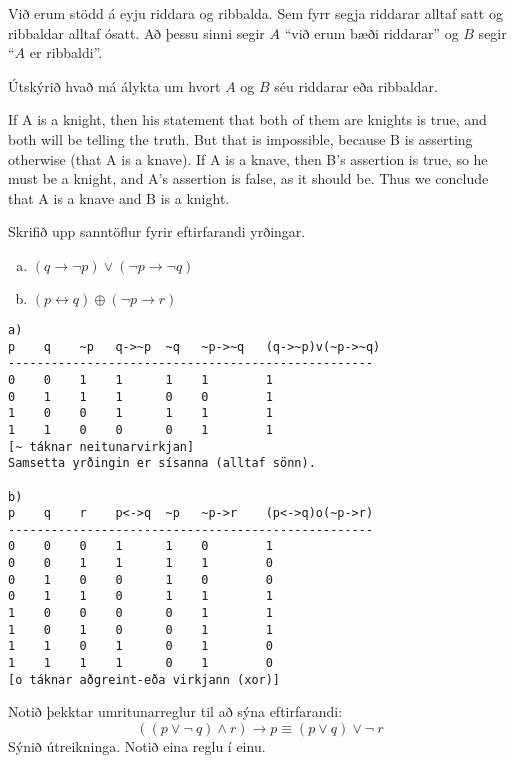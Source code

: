 \documentclass{exam}
\begin{document}
\begin{questions}
\begin{solution}
\end{solution}

\question Við erum stödd á eyju riddara og ribbalda. Sem fyrr segja riddarar alltaf satt og ribbaldar alltaf ósatt. Að þessu sinni segir $A$ ``við erum bæði riddarar'' og $B$ segir ``$A$ er ribbaldi''.

Útskýrið hvað má álykta um hvort $A$ og $B$ séu riddarar eða ribbaldar.

\begin{solution}

If A is a knight, then his statement that both of them are knights is true, and both will be telling the truth. But that is impossible, because B is asserting otherwise (that A is a knave). If A is a knave, then B’s assertion is true, so he must be a knight, and A’s assertion is false, as it should be. Thus we conclude that A is a knave and B is a knight.
\end{solution}

\newpage

\question Skrifið upp sanntöflur fyrir eftirfarandi yrðingar.
\begin{enumerate}[a)]
\item $(q \rightarrow \lnot p) \lor (\lnot p \rightarrow \lnot q)$
\item $(p \leftrightarrow q) \oplus (\lnot p \rightarrow r)$
\end{enumerate}

\begin{solution}
\begin{verbatim}
a)
p    q    ~p   q->~p  ~q   ~p->~q   (q->~p)v(~p->~q)
---------------------------------------------------
0    0    1    1      1	   1        1
0    1    1    1      0    0        1
1    0    0    1      1    1        1
1    1    0    0      0    1        1
[~ táknar neitunarvirkjan]
Samsetta yrðingin er sísanna (alltaf sönn).

b)
p    q    r    p<->q  ~p   ~p->r    (p<->q)o(~p->r)
---------------------------------------------------
0    0    0    1      1    0        1
0    0    1    1      1    1        0
0    1    0    0      1    0        0
0    1    1    0      1    1        1
1    0    0    0      0    1        1
1    0    1    0      0    1        1
1    1    0    1      0    1        0
1    1    1    1      0    1        0
[o táknar aðgreint-eða virkjann (xor)]
\end{verbatim}
\end{solution}

\question Notið þekktar umritunarreglur til að sýna eftirfarandi:
\[ (( p \lor \lnot ~q) \land r) \rightarrow p \equiv (p \lor q) \lor \lnot ~r \]
Sýnið útreikninga. Notið eina reglu í einu.


\end{questions}
\end{document}
